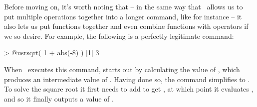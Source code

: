 
Before moving on, it's worth noting that -- in the same way that \R\ allows us to put multiple operations together into a longer command, like  for instance -- it also lets us put functions together and even combine functions with operators if we so desire. For example, the following is a perfectly legitimate command:
\begin{rblock1}
> @usr{sqrt( 1 + abs(-8) )}
[1] 3
\end{rblock1}
When \R\ executes this command, starts out by calculating the value of , which produces an intermediate value of . Having done so, the command simplifies to . To solve the square root it first needs to add  to get , at which point it evaluates , and so it finally outputs a value of .




